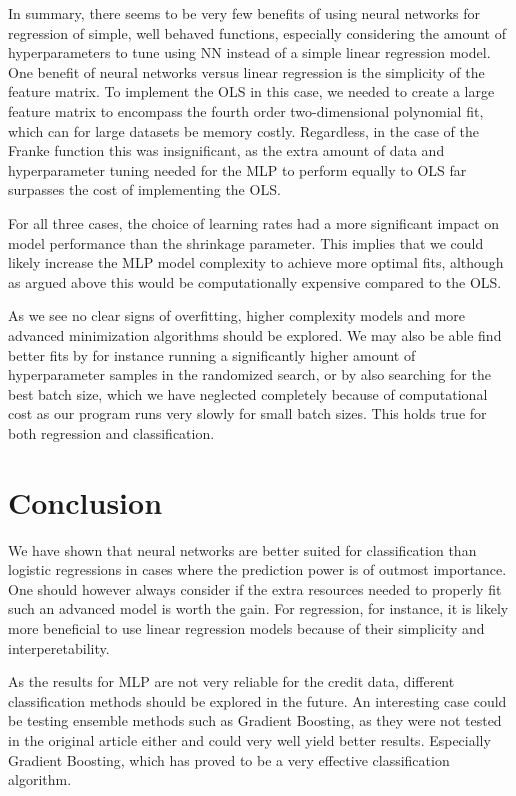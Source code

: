 \documentclass[a4paper, 11pt, twocolumn]{article}
\begin{document}
In summary, there seems to be very few benefits of using neural networks for
regression of simple, well behaved functions, especially considering the amount
of hyperparameters to tune using NN instead of a simple linear regression model.
One benefit of neural networks versus linear regression is the simplicity of the
feature matrix. To implement the OLS in this case, we needed to create a large
feature matrix to encompass the fourth order two-dimensional polynomial fit,
which can for large datasets be memory costly. Regardless, in the case of the
Franke function this was insignificant,  as the extra amount of data and
hyperparameter tuning needed for the MLP to perform equally to OLS far surpasses
the cost of implementing the OLS.

For all three cases, the choice of learning rates had a more significant impact
on model performance than the shrinkage parameter. This implies that we could
likely increase the MLP model complexity to achieve more optimal fits, although as
argued above this would be computationally expensive compared to the OLS.


As we see no clear signs of overfitting,
higher complexity models and more advanced minimization algorithms should be
explored. We may also be able find better fits by for instance running a
significantly higher amount of hyperparameter samples in the randomized search,
or by also searching for the best batch size, which we have neglected completely
because of computational cost as our program runs very slowly for small batch
sizes. This holds true for both regression and classification.

\section{Conclusion}
We have shown that neural networks are better suited for classification than
logistic regressions in cases where the prediction power is of outmost importance.
One should however always consider if the extra resources needed to properly
fit such an advanced model is worth the gain. For regression, for instance, it
is likely more beneficial to use linear regression models because of their
simplicity and interperetability.

As the results for MLP are not very reliable for the credit data, different
classification methods should be explored in the future. An interesting case
could be testing ensemble methods such as Gradient Boosting, as they were
not tested in the original article either \cite{origarticle} and could very well
yield better results. Especially Gradient Boosting, which has proved to be a very
effective classification algorithm.

%

\end{document}
